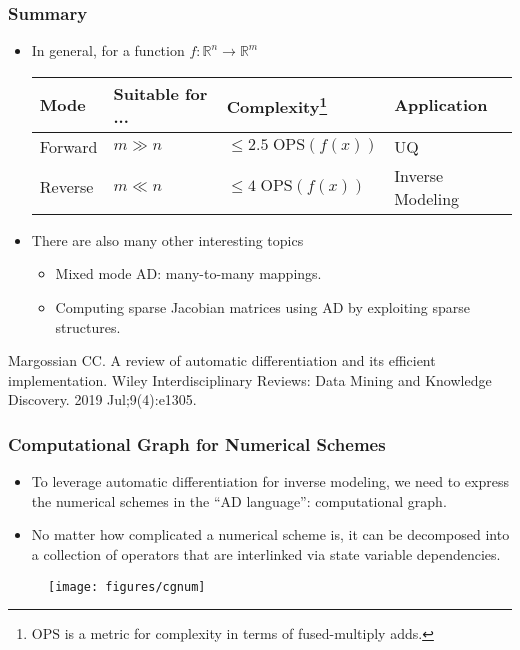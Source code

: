 \documentclass[usenames,dvipsnames]{beamer}
\newcommand{\RR}[0]{\mathbb{R}}
\begin{document}
\begin{frame}
	\frametitle{Summary}
	
	\begin{itemize}
		\item In general, for a function $f:\RR^n \rightarrow \RR^m$
\begin{table}[]
\centering
\begin{tabular}{@{}llll@{}}
\toprule
Mode & Suitable for ... & Complexity\footnote{$\mathrm{OPS}$ is a metric for complexity in terms of fused-multiply adds.} & Application \\ \midrule
Forward & $m\gg n$ & $\leq 2.5\;\mathrm{OPS}(f(x))$ & UQ \\
Reverse & $m\ll n$ & $\leq 4\;\mathrm{OPS}(f(x))$ & Inverse Modeling \\ \bottomrule
\end{tabular}
\end{table}
	
		
		\item There are also many other interesting topics
		\begin{itemize}
		\item Mixed mode AD: many-to-many mappings.
		\item Computing sparse Jacobian matrices using AD by exploiting sparse structures. 
		\end{itemize}
	\end{itemize}
	{\scriptsize Margossian CC. A review of automatic differentiation and its efficient implementation. Wiley Interdisciplinary Reviews: Data Mining and Knowledge Discovery. 2019 Jul;9(4):e1305.} 
\end{frame}

\begin{frame}
	\frametitle{Computational Graph for Numerical Schemes}
	
	\begin{itemize}
		\item To leverage automatic differentiation for inverse modeling, we need to express the numerical schemes in the ``AD language'': computational graph. 
		\item No matter how complicated a numerical scheme is, it can be decomposed into a collection of operators that are interlinked via state variable dependencies. 
	\end{itemize}
	
	\begin{figure}[hbt]
  \texttt{[image: figures/cgnum]}
\end{figure}

	
	
\end{frame}
\end{document}
